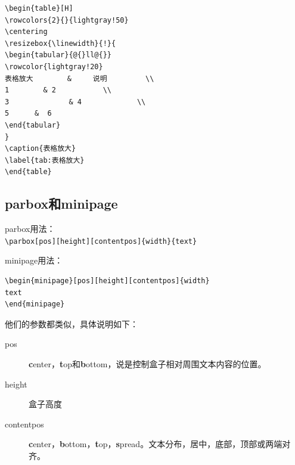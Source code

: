 \documentclass[12pt,oneside]{book}
\begin{document}
\begin{common-format}
\begin{Verbatim}
\begin{table}[H]
\rowcolors{2}{}{lightgray!50}
\centering
\resizebox{\linewidth}{!}{
\begin{tabular}{@{}ll@{}}
\rowcolor{lightgray!20}
表格放大        &     说明         \\ 
1        & 2           \\
3              & 4             \\
5      &  6        
\end{tabular}
}
\caption{表格放大}
\label{tab:表格放大}
\end{table}
\end{Verbatim}


\begin{table}[H]
\centering
{}
\caption{表格放大}
\label{tab:表格放大}
\end{table}



\subsection{parbox和minipage}
parbox用法：\\
\verb+\parbox[pos][height][contentpos]{width}{text}+

minipage用法：
\begin{Verbatim}
\begin{minipage}[pos][height][contentpos]{width}
text
\end{minipage} 
\end{Verbatim}

他们的参数都类似，具体说明如下：
\begin{description}
\item[pos] \textbf{c}enter，\textbf{t}op和\textbf{b}ottom，说是控制盒子相对周围文本内容的位置。
\item[height] 盒子高度
\item[contentpos] \textbf{c}enter，\textbf{b}ottom，\textbf{t}op，\textbf{s}pread。文本分布，居中，底部，顶部或两端对齐。
\end{description}



\end{common-format}
\end{document}
